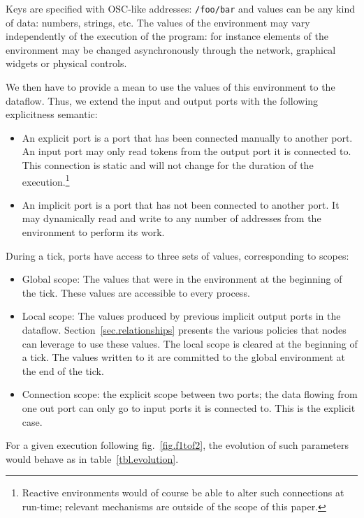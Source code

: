 \documentclass{article}
\begin{document}
Keys are specified with OSC-like\cite{Freed09featuresand} addresses: \lstinline|/foo/bar| and values can be any kind of data: numbers, strings, etc. 
The values of the environment may vary independently of the execution of the program: for instance elements of the environment may be changed asynchronously through the network, graphical widgets or physical controls.
    
We then have to provide a mean to use the values of this environment to the dataflow.
Thus, we extend the input and output ports with the following explicitness semantic: 
    
\begin{itemize}
  \item{An explicit port is a port that has been connected manually to another port.
        An input port may only read tokens from the output port it is connected to.
        This connection is static and will not change for the duration of the execution.\footnote{Reactive environments would of course be able to alter such connections at run-time; relevant mechanisms are outside of the scope of this paper.}} 
  \item{An implicit port is a port that has not been connected to another port. 
        It may dynamically read and write to any number of addresses from the environment to perform its work.}
\end{itemize}
    
During a tick, ports have access to three sets of values, corresponding to scopes: 
\begin{itemize}
  \item {Global scope: The values that were in the environment at the beginning of the tick. 
  These values are accessible to every process.}
  \item {Local scope: The values produced by previous implicit output ports in the dataflow.
        Section~\ref{sec.relationships} presents the various policies that nodes can leverage to use these values. 
        The local scope is cleared at the beginning of a tick. 
        The values written to it are committed to the global environment at the end of the tick.}
  \item{Connection scope: the explicit scope between two ports; the data flowing from one out port can only go to input ports it is connected to. This is the explicit case.}
\end{itemize}

For a given execution following fig.~\ref{fig.f1tof2}, the evolution of such parameters would behave as in table~\ref{tbl.evolution}.
\end{document}
